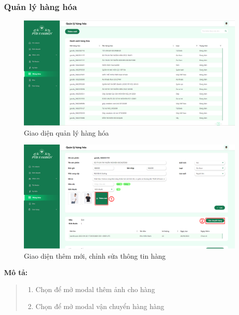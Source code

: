 \newpage
\subsubsection{Quản lý hàng hóa}
\begin{figure}[!htp]
    \centering
    \includegraphics[width=12cm]{img/UI/admin_implement/goods.png}
    \newline
    \caption{Giao diện quản lý hàng hóa}
\end{figure}


\begin{figure}[!htp]
    \centering
    \includegraphics[width=12cm]{img/UI/admin_implement/goodsEdit.png}
    \newline
    \caption{Giao diện thêm mới, chỉnh sửa thông tin hàng}
\end{figure}
\textbf{Mô tả:}
\begin{quote}
    \begin{enumerate}
        \item Chọn để mở modal thêm ảnh cho hàng
        \item Chọn để mở modal vận chuyển hàng hàng
    \end{enumerate}
\end{quote}

